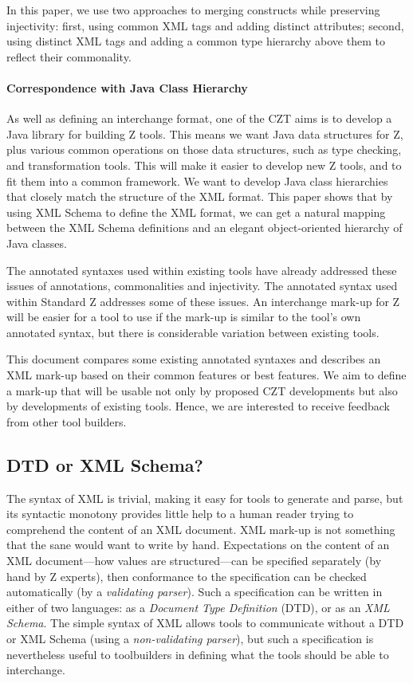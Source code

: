 \documentclass{llncs}  %
\begin{document}
In this paper, we use two approaches to merging constructs while preserving
injectivity: first, using common XML tags and adding distinct attributes;
second, using distinct XML tags and adding a common type hierarchy above
them to reflect their commonality.

\paragraph{Correspondence with Java Class Hierarchy}
As well as defining an interchange format, one of the CZT 
aims is to develop a Java library for building Z tools.  
This means we want Java data structures for Z, plus various
common operations on those data structures, such as type checking,
and transformation tools.  This will make it easier to develop new
Z tools, and to fit them into a common framework.
We want to develop Java class hierarchies
that closely match the structure of the XML format.  
This paper shows that by using XML Schema to define the XML format,
we can get a natural mapping between the XML Schema definitions and
an elegant object-oriented hierarchy of Java classes.

\vspace{1.5ex}

The annotated syntaxes used within existing tools have already
addressed these issues of annotations, commonalities and injectivity.
The annotated syntax used within Standard Z addresses some of these issues.
An interchange mark-up for Z will be easier for a tool to use
if the mark-up is similar to the tool's own annotated syntax,
but there is considerable variation between existing tools. 

This document compares some existing annotated syntaxes and describes an
XML mark-up based on their common features or best features. 
We aim to define a mark-up that will be usable not only by proposed CZT
developments but also by developments of existing tools.  Hence,
we are interested to receive feedback from other tool builders.


\subsection{DTD or XML Schema?}

The syntax of XML\cite{XML} is trivial,
making it easy for tools to generate and parse,
but its syntactic monotony provides little help to a human reader
trying to comprehend the content of an XML document.
XML mark-up is not something that the sane would want to write by hand.
Expectations on the content of an XML document---how values are
structured---can be specified separately (by hand by Z experts),
then conformance to the specification can be checked automatically
(by a \textit{validating parser}).
Such a specification can be written in either of two languages:
as a \textit{Document Type Definition} (DTD), or as an \textit{XML Schema}.
The simple syntax of XML allows tools to communicate
without a DTD or XML Schema (using a \textit{non-validating parser}),
but such a specification is nevertheless useful to toolbuilders
in defining what the tools should be able to interchange.
\end{document}
